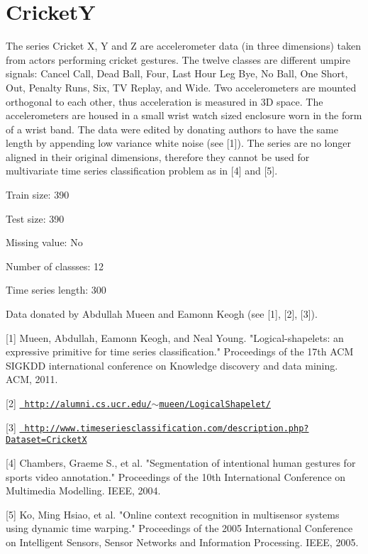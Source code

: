 \chapter{CricketY}
\hypertarget{md_external_2data_2UCRArchive__2018_2CricketY_2README}{}\label{md_external_2data_2UCRArchive__2018_2CricketY_2README}
\label{md_external_2data_2UCRArchive__2018_2CricketY_2README_autotoc_md38}%
%
 The series Cricket X, Y and Z are accelerometer data (in three dimensions) taken from actors performing cricket gestures. The twelve classes are different umpire signals\+: Cancel Call, Dead Ball, Four, Last Hour Leg Bye, No Ball, One Short, Out, Penalty Runs, Six, TV Replay, and Wide. Two accelerometers are mounted orthogonal to each other, thus acceleration is measured in 3D space. The accelerometers are housed in a small wrist watch sized enclosure worn in the form of a wrist band. The data were edited by donating authors to have the same length by appending low variance white noise (see \mbox{[}1\mbox{]}). The series are no longer aligned in their original dimensions, therefore they cannot be used for multivariate time series classification problem as in \mbox{[}4\mbox{]} and \mbox{[}5\mbox{]}.

Train size\+: 390

Test size\+: 390

Missing value\+: No

Number of classses\+: 12

Time series length\+: 300

Data donated by Abdullah Mueen and Eamonn Keogh (see \mbox{[}1\mbox{]}, \mbox{[}2\mbox{]}, \mbox{[}3\mbox{]}).

\mbox{[}1\mbox{]} Mueen, Abdullah, Eamonn Keogh, and Neal Young. "{}\+Logical-\/shapelets\+: an expressive primitive for time series classification."{} Proceedings of the 17th ACM SIGKDD international conference on Knowledge discovery and data mining. ACM, 2011.

\mbox{[}2\mbox{]} \href{http://alumni.cs.ucr.edu/~mueen/LogicalShapelet/}{\texttt{ http\+://alumni.\+cs.\+ucr.\+edu/\texorpdfstring{$\sim$}{\string~}mueen/\+Logical\+Shapelet/}}

\mbox{[}3\mbox{]} \href{http://www.timeseriesclassification.com/description.php?Dataset=CricketX}{\texttt{ http\+://www.\+timeseriesclassification.\+com/description.\+php?\+Dataset=\+CricketX}}

\mbox{[}4\mbox{]} Chambers, Graeme S., et al. "{}\+Segmentation of intentional human gestures for sports video annotation."{} Proceedings of the 10th International Conference on Multimedia Modelling. IEEE, 2004.

\mbox{[}5\mbox{]} Ko, Ming Hsiao, et al. "{}\+Online context recognition in multisensor systems using dynamic time warping."{} Proceedings of the 2005 International Conference on Intelligent Sensors, Sensor Networks and Information Processing. IEEE, 2005. 